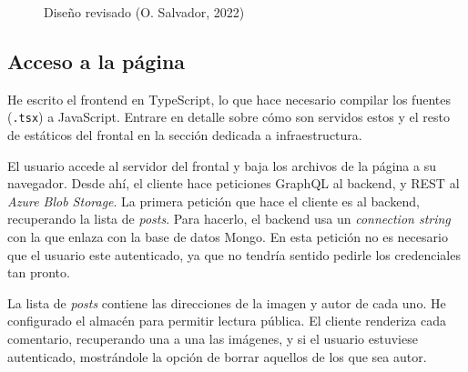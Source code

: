 \documentclass[11pt]{article}
\begin{document}
\begin{flushleft}
	\begin{figure}[htb]
		\centering
		\caption{Diseño revisado (O. Salvador, 2022)}
		\label{alto_nivel}
	\end{figure}


	\subsection{Acceso a la página}
	He escrito el frontend en TypeScript, lo que hace necesario compilar los fuentes (\texttt{.tsx}) a JavaScript. Entrare en detalle sobre cómo son servidos estos y el resto de estáticos del frontal en la sección dedicada a infraestructura. 
	\linebreak
	
	El usuario accede al servidor del frontal y baja los archivos de la página a su navegador. Desde ahí, el cliente hace peticiones GraphQL al backend, y REST al \textit{Azure Blob Storage}. La primera petición que hace el cliente es al backend, recuperando la lista de \textit{posts}. Para hacerlo, el backend usa un \textit{connection string} con la que enlaza con la base de datos Mongo. En esta petición no es necesario que el usuario este autenticado, ya que no tendría sentido pedirle los credenciales tan pronto. 
	\linebreak
	
	La lista de \textit{posts} contiene las direcciones de la imagen y autor de cada uno. He configurado el almacén para permitir lectura pública. El cliente renderiza cada comentario, recuperando una a una las imágenes, y si el usuario estuviese autenticado, mostrándole la opción de borrar aquellos de los que sea autor.
	\linebreak
	

\end{flushleft}
\end{document}
